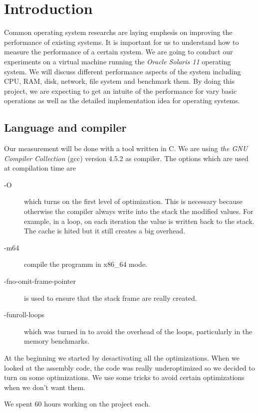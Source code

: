 \section{Introduction}

Common operating system researchs are laying emphesis on improving the performance of existing systems.
It is important for us to understand how to measure the performance of a certain system.
We are going to conduct our experiments on a virtual machine running the \emph{Oracle Solaris
11} operating system.
We will discuss different performance aspects of the system including CPU, RAM, disk,
network, file system and benchmark them.
By doing this project, we are expecting to get an intuite of the performance for
vary basic operations as well as the detailed implementation idea for operating systems.

\subsection{Language and compiler}
Our measurement will be done with a tool written in C.
We are using \emph{the GNU Compiler Collection} (gcc) version 4.5.2 as
compiler.
The options which are used at compilation time are 
\begin{description}
\item[-O] which turns on the first level of optimization.
This is necessary because otherwise the compiler always write into the stack the modified values.
For example, in a loop, on each iteration the value is written back to the stack.
The cache is hited but it still creates a big overhead.
\item[-m64] compile the programm in x86\_64 mode.
\item[-fno-omit-frame-pointer] is used to ensure that the stack frame are really created.
\item[-funroll-loops] which was turned in to avoid the overhead of the loops, particularly in the memory benchmarks.
\end{description}

At the beginning we started by desactivating all the optimizations.
When we looked at the assembly code, the code was really underoptimized so we decided to turn on some optimizations.
We use some tricks to avoid certain optimizations when we don't want them.

We spent 60 hours working on the project each.

